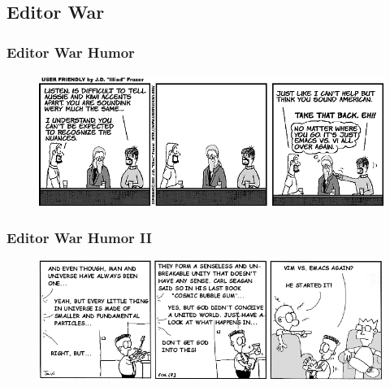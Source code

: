 \documentclass{beamer}
\begin{document}

\subsection{Editor War}
\begin{frame}
\frametitle{Editor War Humor}

\begin{figure}
  \centering
	\includegraphics[scale=0.4,clip=true]{samples/editor_war.png}
  \label{fig:editor_war}
\end{figure}

\end{frame}




\begin{frame}
\frametitle{Editor War Humor II}

\begin{figure}
  \centering
	\includegraphics[scale=0.4,clip=true]{samples/editor_war_2.png}
  \label{fig:editor_war}
\end{figure}

\end{frame}



\end{document}

